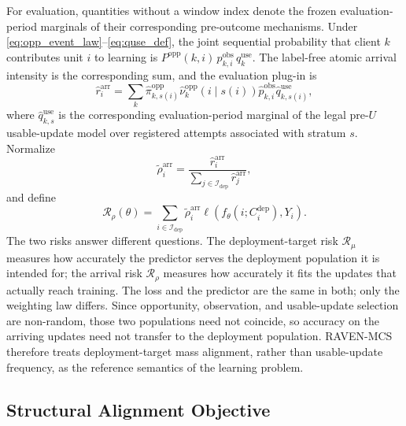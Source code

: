 \documentclass[letterpaper,journal]{IEEEtran}
\begin{document}
For evaluation, quantities without a window index denote the frozen
evaluation-period marginals of their corresponding pre-outcome mechanisms.
Under \eqref{eq:opp_event_law}--\eqref{eq:quse_def}, the joint sequential
probability that client $k$ contributes unit $i$ to learning is
$P^{\mathrm{opp}}(k,i)\,p^{\mathrm{obs}}_{k,i}\,q^{\mathrm{use}}_{k}$.
The label-free atomic arrival intensity is the corresponding sum, and the
evaluation plug-in is
\begin{equation}
 \widehat r_i^{\mathrm{arr}}
 =
 \sum_k
 \widehat\pi^{\mathrm{opp}}_{k,s(i)}
 \widehat\nu^{\mathrm{opp}}_{k}(i\mid s(i))
 \widehat p^{\mathrm{obs}}_{k,i}
 \widehat q^{\mathrm{use}}_{k,s(i)},
 \label{eq:arrival_intensity}
\end{equation}
where $\widehat q^{\mathrm{use}}_{k,s}$ is the corresponding
evaluation-period marginal of the legal pre-$U$ usable-update model over
registered attempts associated with stratum $s$.  Normalize
\begin{equation}
 \widetilde\rho_i^{\mathrm{arr}}
 =
 \frac{\widehat r_i^{\mathrm{arr}}}
 {\sum_{j\in\mathcal{I}_{\mathrm{dep}}}\widehat r_j^{\mathrm{arr}}},
 \label{eq:arrival_distribution}
\end{equation}
and define
\begin{equation}
 \mathcal{R}_{\rho}(\theta)
 =
 \sum_{i\in\mathcal{I}_{\mathrm{dep}}}
 \widetilde\rho_i^{\mathrm{arr}}
 \ell\!\left(
 f_{\theta}(i;C_i^{\mathrm{dep}}),Y_i
 \right).
 \label{eq:arrival_risk}
\end{equation}
The two risks answer different questions.  The deployment-target risk
$\mathcal{R}_{\mu}$ measures how accurately the predictor serves the deployment
population it is intended for; the arrival risk $\mathcal{R}_{\rho}$ measures how
accurately it fits the updates that actually reach training.  The loss and the
predictor are the same in both; only the weighting law differs.  Since
opportunity, observation, and usable-update selection are non-random, those two
populations need not coincide, so accuracy on the arriving updates need not
transfer to the deployment population.  RAVEN-MCS therefore treats
deployment-target mass alignment, rather than usable-update frequency, as the
reference semantics of the learning problem.

\subsection{Structural Alignment Objective}
\label{subsec:design_objective}
\end{document}
